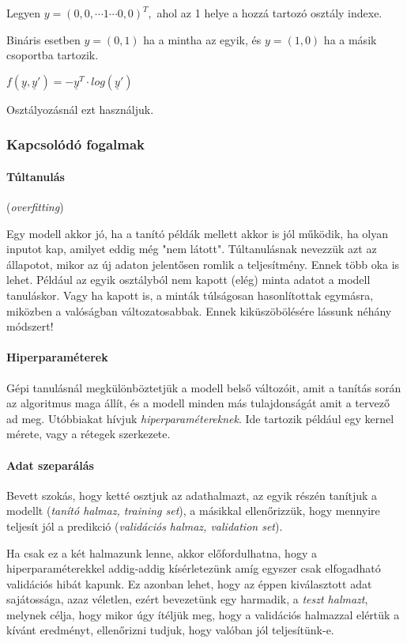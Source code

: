 Legyen $ y = (0, 0, \cdots 1 \cdots 0, 0)^T, $ 
ahol az 1 helye a hozzá tartozó osztály indexe.

Bináris esetben $ y=(0, 1) $ ha a mintha az egyik, és
$ y=(1, 0) $ ha a másik csoportba tartozik.

$ f(\underline{y}, \underline{y}') = - \underline{y}^T \cdot log(\underline{y}') $

\noindent
Osztályozásnál ezt használjuk.



\subsubsection{Kapcsolódó fogalmak}


\paragraph{Túltanulás} (\textit{overfitting})

Egy modell akkor jó, ha a tanító példák mellett akkor is jól működik,
ha olyan inputot kap, amilyet eddig még "nem látott". Túltanulásnak nevezzük
azt az állapotot, mikor az új adaton jelentősen romlik a teljesítmény.
Ennek több oka is lehet. Például az egyik osztályból nem kapott 
(elég) minta adatot a modell tanuláskor. Vagy ha kapott is, a minták túlságosan 
hasonlítottak egymásra, miközben a valóságban változatosabbak.
Ennek kiküszöbölésére lássunk  néhány módszert!


\paragraph{Hiperparaméterek}

Gépi tanulásnál megkülönböztetjük a modell belső változóit, amit 
a tanítás során az algoritmus maga állít, és a modell minden más tulajdonságát
amit a tervező ad meg. Utóbbiakat hívjuk \textit{hiperparamétereknek}.
Ide tartozik például egy kernel mérete, vagy a rétegek szerkezete.

\paragraph{Adat szeparálás}

Bevett szokás, hogy ketté osztjuk az adathalmazt, az egyik részén tanítjuk a
modellt (\textit{tanító halmaz, training set}), a másikkal ellenőrizzük, hogy mennyire teljesít jól a predikció (\textit{validációs halmaz, validation set}).

Ha csak ez a két halmazunk lenne, akkor előfordulhatna, hogy a hiperparaméterekkel
addig-addig kísérletezünk amíg egyszer csak elfogadható validációs hibát kapunk. 
Ez azonban lehet, hogy az éppen kiválasztott adat sajátossága, azaz véletlen,
ezért bevezetünk egy harmadik, a \textit{teszt halmazt}, melynek célja, hogy
mikor úgy ítéljük meg, hogy a validációs halmazzal elértük a kívánt eredményt,
ellenőrizni tudjuk, hogy valóban jól teljesítünk-e.

